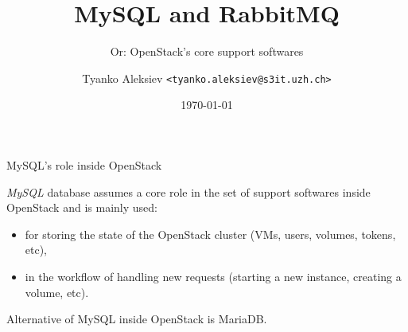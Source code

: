 \documentclass[english,serif,mathserif]{beamer}
\begin{document}
\title[Short Title]{MySQL and RabbitMQ} 
\subtitle{Or: OpenStack's core support softwares} 

\author{Tyanko Aleksiev \texttt{<tyanko.aleksiev@s3it.uzh.ch>}}

\date{\today}

\maketitle

\begin{frame}{MySQL's role inside OpenStack}

\textit{MySQL} database assumes a core role in the set of 
support softwares inside OpenStack and is mainly used:

\begin{itemize}
\item for storing the state of the OpenStack cluster (VMs, users, volumes, tokens, etc), 
\item in the workflow of handling new requests (starting a new instance, creating a volume, etc).
\end{itemize}

Alternative of MySQL inside OpenStack is MariaDB.

\end{frame}
\end{document}
